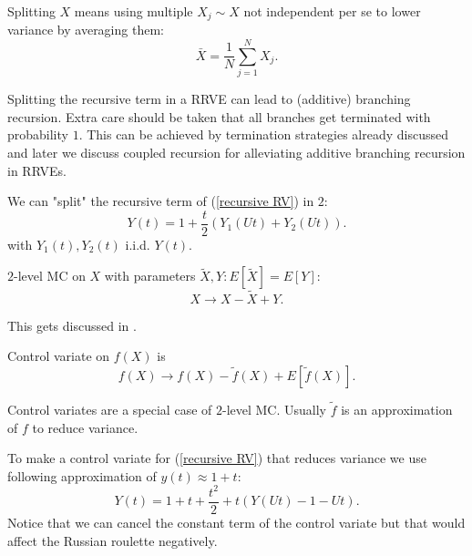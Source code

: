 \documentclass[a4paper,12pt]{article}
\begin{document}
\begin{definition}[splitting]
    Splitting $X$ means using multiple $X_{j} \sim X$ not independent per se to
    lower variance by averaging them:
    \[
        \bar{X}= \frac{1}{N} \sum_{j=1}^{N} X_{j}
        .\]
\end{definition}

Splitting the recursive term in a RRVE can lead to (additive) branching recursion.
Extra care should be taken that all branches get terminated with probability $1$. This can be
achieved by termination strategies already discussed and later we discuss coupled recursion for
alleviating additive branching recursion in RRVEs.

\begin{example}
    We can "split" the recursive term of  (\ref{recursive RV}) in $2$:
    \[
        Y(t) = 1 + \frac{t}{2}(Y_{1}(Ut)+Y_{2}(Ut))
        .\]
    with $Y_{1}(t),Y_{2}(t)$ i.i.d. $Y(t)$.
\end{example}

\vspace{0.2cm}

\begin{pythonn}
\end{pythonn}

\begin{definition}[$2$-level MC] \label{2 level}
    $2$-level MC on $X$ with parameters $\tilde{X}, Y: E[\tilde{X}]=E[Y]$:
    \[
        X \rightarrow X-\tilde{X} + Y
        .\]
\end{definition}

This gets discussed in \cite{giles_multilevel_2013}.

\begin{definition} \label{CV}
    Control variate on $f(X)$ is
    \[
        f(X) \rightarrow f(X)-\tilde{f}(X) + E[\tilde{f}(X)]
        .\]
\end{definition}
Control variates are a special case of $2$-level MC. Usually $\tilde{f}$ is an approximation
of $f$ to reduce variance.

\begin{example}
    To make a control variate for (\ref{recursive RV}) that reduces variance
    we use following approximation of $y(t) \approx 1+t$:
    \[
        Y(t)= 1+t+\frac{t^{2}}{2} + t(Y(Ut)-1-Ut)
        .\]
    Notice that we can cancel the constant term of the control variate
    but that would affect the Russian roulette negatively.
\end{example}
\end{document}
